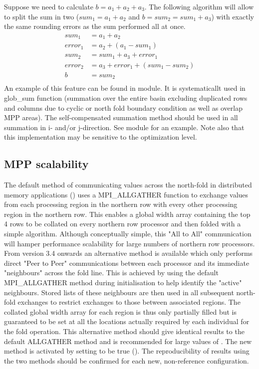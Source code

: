 \documentclass[../main/NEMO_manual]{subfiles}
\begin{document}
Suppose we need to calculate $b = a_1 + a_2 + a_3$.
The following algorithm will allow to split the sum in two
($sum_1 = a_{1} + a_{2}$ and $b = sum_2 = sum_1 + a_3$) with exactly the same rounding errors as
the sum performed all at once.
\begin{align*}
	sum_1 \ \  &= a_1 + a_2 \\
	error_1     &= a_2 + ( a_1 - sum_1 ) \\
	sum_2 \ \  &= sum_1 + a_3 + error_1 \\
	error_2     &= a_3 + error_1 + ( sum_1 - sum_2 ) \\
	b \qquad \ &= sum_2 \\
\end{align*}
An example of this feature can be found in  module.
It is systematicallt used in glob\_sum function (summation over the entire basin excluding duplicated rows and
columns due to cyclic or north fold boundary condition as well as overlap MPP areas).
The self-compensated summation method should be used in all summation in i- and/or j-direction.
See  module for an example.
Note also that this implementation may be sensitive to the optimization level.

\subsection{MPP scalability}
\label{subsec:MISC_mppsca}

The default method of communicating values across the north-fold in distributed memory applications ()
uses a \textsc{MPI\_ALLGATHER} function to exchange values from each processing region in
the northern row with every other processing region in the northern row.
This enables a global width array containing the top 4 rows to be collated on every northern row processor and then
folded with a simple algorithm.
Although conceptually simple, this "All to All" communication will hamper performance scalability for
large numbers of northern row processors.
From version 3.4 onwards an alternative method is available which only performs direct "Peer to Peer" communications
between each processor and its immediate "neighbours" across the fold line.
This is achieved by using the default \textsc{MPI\_ALLGATHER} method during initialisation to
help identify the "active" neighbours.
Stored lists of these neighbours are then used in all subsequent north-fold exchanges to
restrict exchanges to those between associated regions.
The collated global width array for each region is thus only partially filled but is guaranteed to
be set at all the locations actually required by each individual for the fold operation.
This alternative method should give identical results to the default \textsc{ALLGATHER} method and
is recommended for large values of .
The new method is activated by setting  to be true ().
The reproducibility of results using the two methods should be confirmed for each new,
non-reference configuration.
\end{document}
